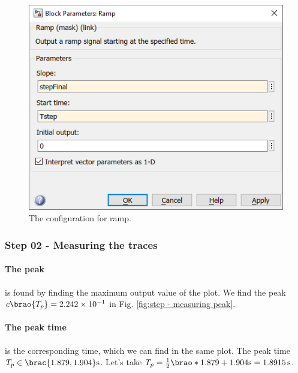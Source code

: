 \documentclass[12pt]{article}
\DeclarePairedDelimiter\brao()%
\DeclarePairedDelimiter\brac[]%
\begin{document}
\begin{figure}[h]
    \centering
    \includegraphics[width=(5in/689)*464]{part01b_ramp_parameters.png}
    \caption{The configuration for ramp.}
    \label{fig:ramp response model parameters}
\end{figure}

\subsubsection{Step 02 - Measuring the traces}

\paragraph{The peak} is found by finding the maximum output value of the plot.
We find the peak $c\brao{T_p} = \num{2.242e-1}$ in Fig. \ref{fig:step - measuring peak}.

\paragraph{The peak time} is the corresponding time, which we can find in the same plot.
The peak time $T_p \in \brac{{1.879}, {1.904}}\si\second$.
Let's take $T_p = \frac12\brao*{1.879 + 1.904}\si\second = \SI{1.8915}\second$.
\end{document}
